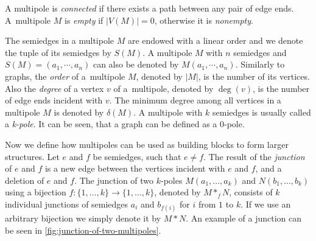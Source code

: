 \documentclass[12pt, twoside]{book}
\begin{document}
A multipole is \textit{connected} if there exists a path between any pair of edge ends. A~multipole $M$ is \textit{empty} if $|V(M)|=0$, otherwise it is \textit{nonempty}.

The semiedges in a multipole $M$ are endowed with a linear order and we denote the tuple of its semiedges by $S(M)$. A multipole $M$ with $n$ semiedges and ${S(M) = (a_1, \cdots, a_n)}$ can also be denoted by $M(a_1,\cdots,a_n)$. Similarly to graphs, the \textit{order} of a~multipole $M$, denoted by $|M|$, is the number of its vertices. Also the \textit{degree} of a vertex $v$ of a~multipole, denoted by $\deg(v)$, is the number of edge ends incident with $v$. The minimum degree among all vertices in a multipole $M$ is denoted by $\delta(M)$. A multipole with $k$ semiedges is usually called a \textit{k-pole}. It can be seen, that a graph can be defined as a 0-pole.

Now we define how multipoles can be used as building blocks to form larger structures. Let $e$ and $f$ be semiedges, such that $e\neq f$. The result of the \textit{junction} of $e$ and $f$ is a new edge between the vertices incident with $e$ and $f$, and a deletion of $e$ and $f$. The junction of two $k$-poles $M(a_1,\dots,a_k)$ and $N(b_1,\dots,b_k)$ using a bijection ${f:\{1,\dots,k\}\rightarrow\{1,\dots,k\}}$, denoted by $M*_fN$, consists of $k$ individual junctions of semiedges $a_i$ and $b_{f(i)}$ for $i$ from $1$ to $k$. If we use an arbitrary bijection we simply denote it by $M*N$. An example of a junction can be seen in \cref{fig:junction-of-two-multipoles}.
\end{document}
